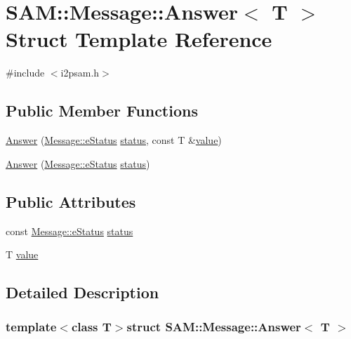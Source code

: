 \hypertarget{struct_s_a_m_1_1_message_1_1_answer}{}\section{S\+A\+M\+:\+:Message\+:\+:Answer$<$ T $>$ Struct Template Reference}
\label{struct_s_a_m_1_1_message_1_1_answer}


{\ttfamily \#include $<$i2psam.\+h$>$}

\subsection*{Public Member Functions}
\begin{DoxyCompactItemize}
\item 
\hyperlink{struct_s_a_m_1_1_message_1_1_answer_aa6793a24ffebfe9e481b228ed8e5be61}{Answer} (\hyperlink{class_s_a_m_1_1_message_a5f7e317defb90f107fc1a017a4552ae9}{Message\+::e\+Status} \hyperlink{struct_s_a_m_1_1_message_1_1_answer_a5d79819d3f9780108d1c14c376b5433b}{status}, const T \&\hyperlink{struct_s_a_m_1_1_message_1_1_answer_a1353bce316f2d809131541f2ca980b64}{value})
\item 
\hyperlink{struct_s_a_m_1_1_message_1_1_answer_a541668b033182a7be17499a3e67030ba}{Answer} (\hyperlink{class_s_a_m_1_1_message_a5f7e317defb90f107fc1a017a4552ae9}{Message\+::e\+Status} \hyperlink{struct_s_a_m_1_1_message_1_1_answer_a5d79819d3f9780108d1c14c376b5433b}{status})
\end{DoxyCompactItemize}
\subsection*{Public Attributes}
\begin{DoxyCompactItemize}
\item 
const \hyperlink{class_s_a_m_1_1_message_a5f7e317defb90f107fc1a017a4552ae9}{Message\+::e\+Status} \hyperlink{struct_s_a_m_1_1_message_1_1_answer_a5d79819d3f9780108d1c14c376b5433b}{status}
\item 
T \hyperlink{struct_s_a_m_1_1_message_1_1_answer_a1353bce316f2d809131541f2ca980b64}{value}
\end{DoxyCompactItemize}


\subsection{Detailed Description}
\subsubsection*{template$<$class T$>$struct S\+A\+M\+::\+Message\+::\+Answer$<$ T $>$}



